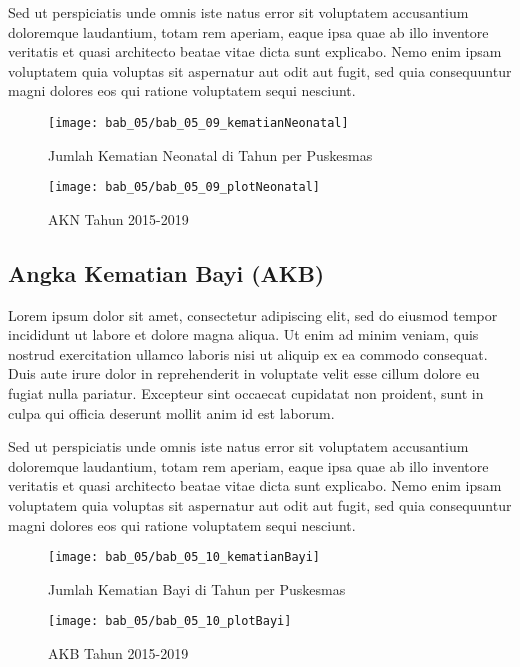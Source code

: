 Sed ut perspiciatis unde omnis iste natus error sit voluptatem accusantium doloremque laudantium, totam rem aperiam, eaque ipsa quae ab illo inventore veritatis et quasi architecto beatae vitae dicta sunt explicabo. Nemo enim ipsam voluptatem quia voluptas sit aspernatur aut odit aut fugit, sed quia consequuntur magni dolores eos qui ratione voluptatem sequi nesciunt.

\begin{figure}[H]
    \centering{}
    \texttt{[image: bab\_05/bab\_05\_09\_kematianNeonatal]}
    \caption{Jumlah Kematian Neonatal di \namaKabupaten Tahun \tP per Puskesmas}
    \label{fig:Jumlah-Kematian-Neonatal}
\end{figure}

\begin{figure}[H]
    \centering{}
    \texttt{[image: bab\_05/bab\_05\_09\_plotNeonatal]}
    \caption{AKN \namaKabupaten Tahun 2015-2019}
    \label{fig:AKN-2015-2019}
\end{figure}


\subsection{Angka Kematian Bayi (AKB)}
Lorem ipsum dolor sit amet, consectetur adipiscing elit, sed do eiusmod tempor incididunt ut labore et dolore magna aliqua. Ut enim ad minim veniam, quis nostrud exercitation ullamco laboris nisi ut aliquip ex ea commodo consequat. Duis aute irure dolor in reprehenderit in voluptate velit esse cillum dolore eu fugiat nulla pariatur. Excepteur sint occaecat cupidatat non proident, sunt in culpa qui officia deserunt mollit anim id est laborum.

Sed ut perspiciatis unde omnis iste natus error sit voluptatem accusantium doloremque laudantium, totam rem aperiam, eaque ipsa quae ab illo inventore veritatis et quasi architecto beatae vitae dicta sunt explicabo. Nemo enim ipsam voluptatem quia voluptas sit aspernatur aut odit aut fugit, sed quia consequuntur magni dolores eos qui ratione voluptatem sequi nesciunt.

\begin{figure}[H]
    \centering{}
    \texttt{[image: bab\_05/bab\_05\_10\_kematianBayi]}
    \caption{Jumlah Kematian Bayi di \namaKabupaten Tahun \tP per Puskesmas}
    \label{fig:Jumlah-Kematian-Bayi}
\end{figure}

\begin{figure}[H]
    \centering{}
    \texttt{[image: bab\_05/bab\_05\_10\_plotBayi]}
    \caption{AKB \namaKabupaten Tahun 2015-2019}
    \label{fig:AKB-2015-2019}
\end{figure}


